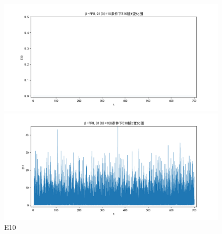 \documentclass[10pt, a4paper]{article}
\begin{document}
    \begin{figure}[H]
        \begin{minipage}[t]{0.49\textwidth}
            \centering
            \includegraphics[width=\textwidth]{./q6_pics/cmp/E10.png}
        \end{minipage}
        \begin{minipage}[t]{0.49\textwidth}
            \centering
            \includegraphics[width=\textwidth]{./q6_pics/exp/E10.png}
        \end{minipage}
        \caption{E10}\label{fig:E10 in q6}
    \end{figure}
\end{document}
